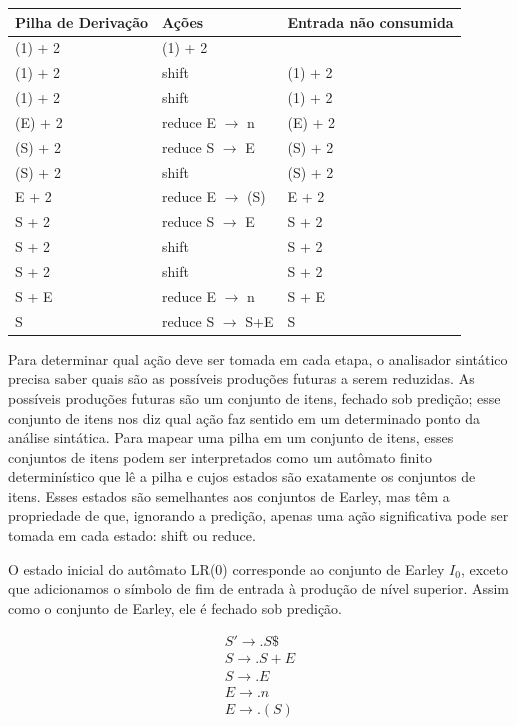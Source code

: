 \begin{table}[H]
\begin{tabular}{@{}lll@{}}
  \toprule
  Pilha de Derivação & Ações & Entrada não consumida \\
  \midrule
  (1) + 2 & (1) + 2 & \\
  (1) + 2 & shift & (1) + 2 \\
  (1) + 2 & shift & (1) + 2 \\
  (E) + 2 & reduce E $\to$ n & (E) + 2 \\
  (S) + 2 & reduce S $\to$ E & (S) + 2 \\
  (S) + 2 & shift & (S) + 2 \\
  E + 2 & reduce E $\to$ (S) & E + 2 \\
  S + 2 & reduce S $\to$ E & S + 2 \\
  S + 2 & shift & S + 2 \\
  S + 2 & shift & S + 2 \\
  S + E & reduce E $\to$ n & S + E \\
  S & reduce S $\to$ S+E & S \\
  \bottomrule
\end{tabular}
\centering
\end{table}

Para determinar qual ação deve ser tomada em cada etapa, o analisador
sintático precisa saber quais são as possíveis produções futuras a
serem reduzidas. As possíveis produções futuras são um conjunto de
itens, fechado sob predição; esse conjunto de itens nos diz qual ação
faz sentido em um determinado ponto da análise sintática. Para mapear
uma pilha em um conjunto de itens, esses conjuntos de itens podem ser
interpretados como um autômato finito determinístico que lê a pilha e
cujos estados são exatamente os conjuntos de itens. Esses estados são
semelhantes aos conjuntos de Earley, mas têm a propriedade de que,
ignorando a predição, apenas uma ação significativa pode ser tomada
em cada estado: shift ou reduce.

O estado inicial do autômato LR(0) corresponde ao conjunto de Earley
\(I_0\), exceto que adicionamos o símbolo de fim de entrada à
produção de nível superior. Assim como o conjunto de Earley, ele é
fechado sob predição.

\[
\begin{array}{l}
  S' \to . S \$\\
  S \to . S + E\\
  S \to . E\\
  E \to . n\\
  E \to . ( S )\\
\end{array}
\]

